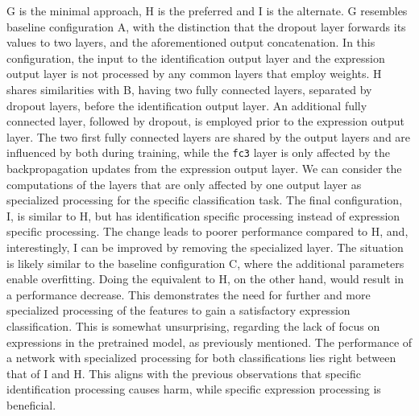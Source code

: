 \noindent G is the minimal approach, H is the preferred and I is the alternate. G resembles baseline configuration A, with the distinction that the dropout layer forwards its values to two layers, and the aforementioned output concatenation. In this configuration, the input to the identification output layer and the expression output layer is not processed by any common layers that employ weights. H shares similarities with B, having two fully connected layers, separated by dropout layers, before the identification output layer. An additional fully connected layer, followed by dropout, is employed prior to the expression output layer. The two first fully connected layers are shared by the output layers and are influenced by both during training, while the \texttt{fc3} layer is only affected by the backpropagation updates from the expression output layer. We can consider the computations of the layers that are only affected by one output layer as specialized processing for the specific classification task. The final configuration, I, is similar to H, but has identification specific processing instead of expression specific processing. The change leads to poorer performance compared to H, and, interestingly, I can be improved by removing the specialized layer. The situation is likely similar to the baseline configuration C, where the additional parameters enable overfitting. Doing the equivalent to H, on the other hand, would result in a performance decrease. This demonstrates the need for further and more specialized processing of the features to gain a satisfactory expression classification. This is somewhat unsurprising, regarding the lack of focus on expressions in the pretrained model, as previously mentioned. The performance of a network with specialized processing for both classifications lies right between that of I and H. This aligns with the previous observations that specific identification processing causes harm, while specific expression processing is beneficial.

